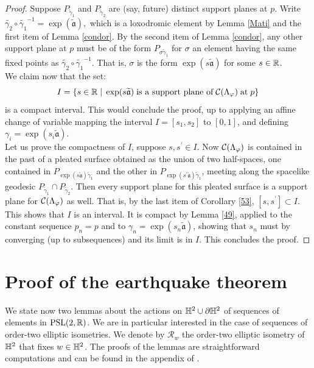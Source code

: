 \begin{proof}
Suppose $P_{\widetilde{\gamma}_1}$ and $P_{\widetilde{\gamma}_2}$ are (say, future) distinct support planes at $p$. Write $\widetilde{\gamma_2}\circ\widetilde{\gamma_1}^{-1}=\exp(\widetilde{\mathfrak{a}}),$ which is a loxodromic element by Lemma \ref{Mati} and the first item of Lemma \ref{condor}. By the second item of Lemma \ref{condor}, any other support plane at $p$ must be of the form $P_{\sigma\widetilde{\gamma}_1}$ for $\sigma$ an element having the same fixed points as $\widetilde{\gamma_2}\circ\widetilde{\gamma_1}^{-1}$. That is, $\sigma$ is the form $\exp(s\widetilde{\mathfrak{a}})$ for some $s\in\mathbb{R}$.\\
We claim now that the set: 
\[
    I=\{s\in\mathbb{R}\;|\;\exp(s\widetilde{\mathfrak{a}})\;\text{is a support plane of}\;\mathcal{C}(\Lambda_\varphi)\;\text{at}\;p\}
\]
is a compact interval. This would conclude the proof, up to applying an affine change of variable mapping the interval $I=[s_1,s_2]$ to $[0,1]$, and defining $\gamma_i=\exp(s_i\widetilde{\mathfrak{a}}).$\\
Let us prove the compactness of $I$, suppose $s,s^{\prime} \in I$. Now $\mathcal{C}(\Lambda_\varphi)$ is contained in the past of a pleated surface obtained as the union of two half-spaces, one contained in $P_{\exp(s\widetilde{\mathfrak{a}})\widetilde{\gamma}_1}$ and the other in $P_{\exp(s^{\prime}\widetilde{\mathfrak{a}})\widetilde{\gamma}_1}$, meeting along the spacelike geodesic $P_{\widetilde{\gamma}_1}\cap P_{\widetilde{\gamma}_2}$. Then every support plane for this pleated surface is a support plane for $\mathcal{C}(\Lambda_\varphi)$ as well. That is, by the last item of Corollary \ref{53}, $[s,s^{\prime}]\subset I$. This shows that $I$ is an interval. It is compact by Lemma \ref{49}, applied to the constant sequence $p_n=p$ and to $\gamma_n=\exp(s_n\widetilde{\mathfrak{a}})$, showing that $s_n$ must by converging (up to subsequences) and its limit is in $I$. This concludes the proof.  

\end{proof}

\section{Proof of the earthquake theorem}

We state now two lemmas about the actions on $\mathbb{H}^2\cup\partial\mathbb{H}^2$ of sequences of elements in $\text{PSL}(2,\mathbb{R})$. We are in particular interested in the case of sequences of order-two elliptic isometries. We denote by $\mathcal{R}_w$ the order-two elliptic isometry of $\mathbb{H}^2$ that fixes $w\in\mathbb{H}^2$. The proofs of the lemmas are straightforward computations and can be found in the appendix of \cite{diaf2023anti}. 

